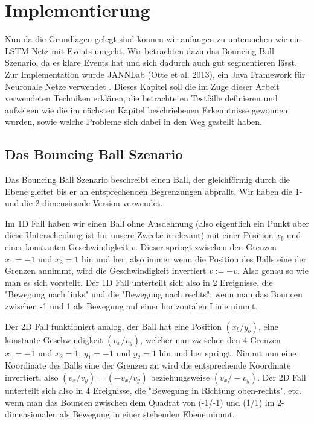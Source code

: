 \chapter{Implementierung}
Nun da die Grundlagen gelegt sind können wir anfangen zu untersuchen wie ein LSTM Netz mit Events umgeht. Wir betrachten dazu das Bouncing Ball Szenario, da es klare Events hat und sich dadurch auch gut segmentieren lässt. Zur Implementation wurde JANNLab (Otte et al. 2013), ein Java Framework für Neuronale Netze verwendet \cite{bib:jannlab}. Dieses Kapitel soll die im Zuge dieser Arbeit verwendeten Techniken erklären, die betrachteten Testfälle definieren und aufzeigen wie die im nächsten Kapitel beschriebenen Erkenntnisse gewonnen wurden, sowie welche Probleme sich dabei in den Weg gestellt haben.

\section{Das Bouncing Ball Szenario}
Das Bouncing Ball Szenario beschreibt einen Ball, der gleichförmig durch die Ebene gleitet bis er an entsprechenden Begrenzungen abprallt. Wir haben die 1- und die 2-dimensionale Version verwendet.

Im 1D Fall haben wir einen Ball ohne Ausdehnung (also eigentlich ein Punkt aber diese Unterscheidung ist für unsere Zwecke irrelevant) mit einer Position $ x_{b} $ und einer konstanten Geschwindigkeit $  v$. Dieser springt zwischen den Grenzen $ x_{1}=-1 $ und $ x_{2}=1 $ hin und her, also immer wenn die Position des Balls eine der Grenzen annimmt, wird die Geschwindigkeit invertiert $ v := -v $. Also genau so wie man es sich vorstellt. Der 1D Fall unterteilt sich also in 2 Ereignisse, die "Bewegung nach links" und die "Bewegung nach rechts", wenn man das Bouncen zwischen -1 und 1 als Bewegung auf einer horizontalen Linie nimmt.

Der 2D Fall funktioniert analog, der Ball hat eine Position $ (x_{b}/y_{b}) $, eine konstante Geschwindigkeit $ (v_{x}/v_{y}) $, welcher nun zwischen den 4 Grenzen $ x_{1}=-1 $ und $ x_{2}=1 $, $ y_{1}=-1 $ und $ y_{2}=1 $ hin und her springt. Nimmt nun eine Koordinate des Balls eine der Grenzen an wird die entsprechende Koordinate invertiert, also $ (v_{x}/v_{y}) = (-v_{x}/v_{y}) $ beziehungsweise $ (v_{x}/-v_{y}) $. Der 2D Fall unterteilt sich also in 4 Ereignisse, die "Bewegung in Richtung oben-rechts", etc. wenn man das Bouncen zwischen dem Quadrat von (-1/-1) und (1/1) im 2-dimensionalen als Bewegung in einer stehenden Ebene nimmt.

